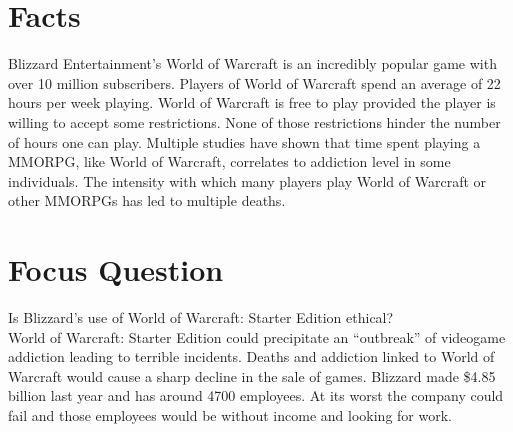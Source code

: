 \documentclass[11pt]{article}
\begin{document}
\begin{multicols}{2}
\setcounter{page}{1}


\section{Facts}

Blizzard Entertainment's World of Warcraft is an incredibly popular game with over 10 million subscribers. \cite{WoWPlayerCount} Players of World of Warcraft spend an average of 22 hours per week playing. \cite{PlayerMotivations} World of Warcraft is free to play provided the player is willing to accept some restrictions. None of those restrictions hinder the number of hours one can play. \cite{StarterEditionFAQ} Multiple studies have shown that time spent playing a MMORPG, like World of Warcraft, correlates to addiction level in some individuals. \cite{ProblemUsageAmongHighlyEngagedPlayers}\cite{JustAComputerGameRight} The intensity with which many players play World of Warcraft or other MMORPGs has led to multiple deaths. \cite{SnowlyDeath}\cite{ShawnDeath}\cite{ParentsBlameWoWForDeath}\cite{DeathAfter50Hours}\cite{YouStoleMySwordNowYouDie}


\section{Focus Question}
Is Blizzard's use of World of Warcraft: Starter Edition ethical? \\

World of Warcraft: Starter Edition could precipitate an ``outbreak'' of videogame addiction leading to terrible incidents. \cite{SnowlyDeath}\cite{ShawnDeath}\cite{ParentsBlameWoWForDeath}\cite{DeathAfter50Hours}\cite{YouStoleMySwordNowYouDie} Deaths and addiction linked to World of Warcraft would cause a sharp decline in the sale of games. Blizzard made \$4.85 billion last year and has around 4700 employees. \cite{BlizzardFinances}\cite{BlizzardEmployeeCount} At its worst the company could fail and those employees would be without income and looking for work.



\end{multicols}
\end{document}
